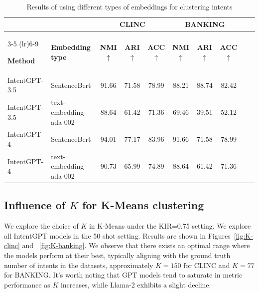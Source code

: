 \documentclass[11pt]{article}
\begin{document}
\begin{table}[t]
    \centering
    \begin{tabular}{@{}llcccccccc@{}} %
        \toprule
        && \multicolumn{3}{c}{\textbf{CLINC}} & \multicolumn{3}{c}{\textbf{BANKING}} \\
        \cmidrule(lr){3-5} \cmidrule(lr){6-9}

        \textbf{Method} & \textbf{Embedding type} & \textbf{NMI} $\uparrow$ & \textbf{ARI}$\uparrow$ & \textbf{ACC}$\uparrow$& \textbf{NMI} $\uparrow$ & \textbf{ARI}$\uparrow$ & \textbf{ACC}$\uparrow$ \\
        \midrule

           IntentGPT-3.5 & SentenceBert & 91.66 & 71.58 & 78.99 & 88.21 & 88.74 & 82.42 \\

            IntentGPT-3.5 & text-embedding-ada-002 & 88.64 & 61.42 & 71.36 & 69.46 & 39.51 & 52.12\\
                                          
            IntentGPT-4 & SentenceBert & 94.01 & 77.17 & 83.96 & 91.66 & 71.58 & 78.99\\
                                           
            IntentGPT-4 & text-embedding-ada-002 & 90.73 & 65.99 & 74.89 & 88.64 & 61.42 & 71.36 \\
                                            
        \bottomrule
    \end{tabular}
    
    
    \vspace{-3mm}
\caption{Results of using different types of embeddings for clustering intents}
\vspace{-2mm}
\label{tab:embeddings}
\end{table}


\subsection{Influence of $K$ for K-Means clustering}
We explore the choice of $K$ in K-Means under the KIR=0.75 setting. We explore all IntentGPT models in the 50 shot setting. Results are shown in Figures~\ref{fig:K-clinc} and ~\ref{fig:K-banking}. We observe that there exists an optimal range where the models perform at their best, typically aligning with the ground truth number of intents in the datasets, approximately $K=150$ for CLINC and $K=77$ for BANKING. It's worth noting that GPT models tend to saturate in metric performance as $K$ increases, while Llama-2 exhibits a slight decline. 
\end{document}
